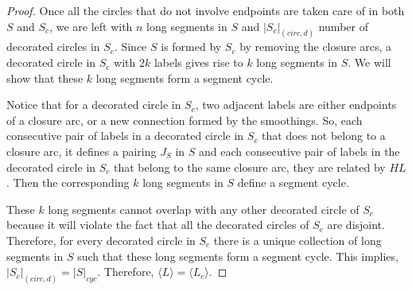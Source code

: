 \documentclass[10pt,a4paper]{amsart}
\begin{document}
\begin{proof}


Once all the circles that do not involve endpoints are taken care of in both $S$ and $S_c$, we are left with $n$ long segments in $S$ and $|S_c|_{(circ,d)}$ number of decorated circles in $S_c$. 
Since $S$ is formed by $S_c$ by removing the closure arcs, a decorated circle in $S_c$ with $2k$ labels gives rise to $k$ long segments in $S$. 
We will show that these $k$ long segments form a segment cycle. 

Notice that for a decorated circle in $S_c$, two adjacent labels are either endpoints of a closure arc, or a new connection formed by the smoothings. So, each consecutive pair of labels in a decorated circle in $S_c$ that does not belong to a closure arc, it defines a pairing $J_S$ in $S$ and each consecutive pair of labels in the decorated circle in $S_c$ that belong to the same closure arc, they are related by $HL$. Then the corresponding $k$ long segments in $S$ define a segment cycle. %

These $k$ long segments cannot overlap with any other decorated circle of $S_c$ because it will violate the fact that all the decorated circles of $S_c$ are disjoint. Therefore, for every decorated circle in $S_c$ there is a unique collection of long segments in $S$ such that these long segments form a segment cycle. This implies, $|S_c|_{(circ,d)} = |S|_{cyc}$. Therefore, $\langle L \rangle = \langle L_c \rangle$.  
\end{proof}
\end{document}
